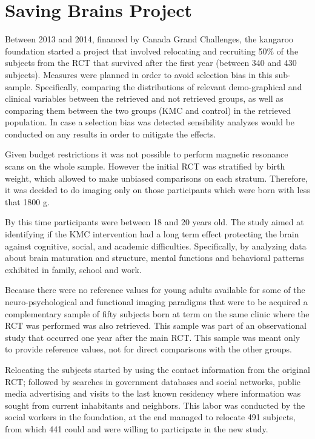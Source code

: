 \section{Saving Brains Project}





Between 2013 and 2014, financed by Canada Grand Challenges, the kangaroo foundation started a project that involved relocating and recruiting 50\% of the subjects from the RCT that survived after the first year (between 340 and 430 subjects). Measures were planned in order to avoid selection bias in this sub-sample. Specifically, comparing the distributions of relevant demo-graphical and clinical variables between the retrieved and not retrieved groups, as well as comparing them between the two groups (KMC and control) in the retrieved population. In case a selection bias was detected sensibility analyzes would be conducted on any results in order to mitigate the effects. 

Given budget restrictions it was not possible to perform magnetic resonance scans on the whole sample. However the initial RCT was stratified by birth weight, which allowed to make unbiased comparisons on each stratum. Therefore, it was decided to do imaging only on those participants which were born with less that 1800 g. 

By this time participants were between 18 and 20 years old. The study aimed at identifying if the KMC intervention had a long term effect protecting the brain against cognitive, social, and academic difficulties. Specifically, by analyzing data about brain maturation and structure, mental functions and behavioral patterns exhibited in family, school and work. 

Because there were no reference values for young adults available for some of the neuro-psychological and functional imaging paradigms that were to be acquired a complementary sample of fifty subjects born at term on the same clinic where the RCT was performed was also retrieved. This sample was part of an observational study that occurred one year after the main RCT. This sample was meant only to provide reference values, not for direct comparisons with the other groups.

Relocating the subjects started by using the contact information from the original RCT; followed by searches in government databases and social networks, public media advertising and visits to the last known residency where information was sought from current inhabitants and neighbors. This labor was conducted by the social workers in the foundation, at the end managed to relocate 491 subjects, from which 441 could and were willing to participate in the new study. 


